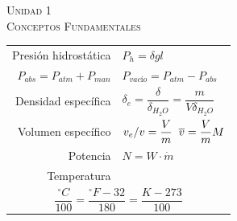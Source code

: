 \documentclass[11pt,a4paper,twocolumn]{article}
\newcommand{\unidad}[2]{\begin{center}
		\fontsize{10}{10}\selectfont\color{gray!50!black}\scshape Unidad #1 \\
		\fontsize{14}{14}\selectfont \scshape #2
	\end{center} \vspace{-.5cm}}
\begin{document}

\unidad{1}{Conceptos Fundamentales}
\vspace{0.1cm}
	\begin{tcolorbox}[colback=white!97!brown, colframe=brown!15!gray]
		\begin{tabular}{r l}
			
			\vspace{.1cm}	Presión hidrostática 		& $P_{h}=\delta g l$ \\
			\vspace{.1cm}	 $P_{abs}=P_{atm}+P_{man}$	 & $P_{vacío} = P_{atm} - P_{abs}$ \\ 
			\vspace{.1cm}	Densidad específica			 & $\delta_{e} = \dfrac{\delta}{\delta_{H_{2}O}}=\dfrac{m}{V \delta_{H_{2}O}}$ \\
			\vspace{.1cm} Volumen específico 			& $v_{e}/v=\dfrac{V}{m} \hspace{.2cm} \overline{v}=\dfrac{V}{m}M$ \\

			\vspace{.1cm} Potencia 						& $N=W\cdot \dot{m}$\\
			\vspace{.1cm}Temperatura 					& \\ \multicolumn{2}{c}{$\dfrac{^{\circ}C}{100}=\dfrac{^{\circ}F-32}{180}=\dfrac{K-273}{100}$} \\	
	\end{tabular}
	\end{tcolorbox}

\end{document}
